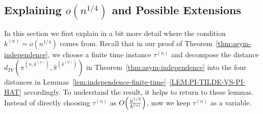 \documentclass[sigconf]{acmart}
\newcommand{\supn}{^{(n)}}
\begin{document}
\subsection{Explaining $o(n^{1/4})$ and Possible Extensions}\label{sec:explain}
In this section we first explain in a bit more detail where the condition $k\supn=o(n^{1/4})$ comes from.  Recall that in our proof of Theorem~\ref{thm:asym-independence}, we choose a finite time instance $\tau\supn$ and decompose the distance $d_{TV}\left(\pi^{(n,k\supn)},\hat{\pi}^{(k\supn)}\right)$ in Theorem~\ref{thm:asym-independence} into the four distances in Lemmas~\ref{lem:independence-finite-time}--\ref{LEM:PI-TILDE-VS-PI-HAT} accordingly. To understand the result, it helps to return to these lemmas. Instead of directly choosing $\tau\supn$ as $O\Bigl(\frac{n^{1/2}}{k\supn}\Bigr)$, now we keep $\tau\supn$ as a variable.
\end{document}
